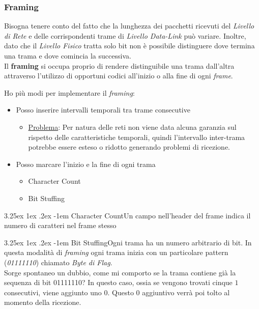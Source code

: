 \documentclass{article}
\makeatletter
\newcounter{subsubsubsection}[subsubsection]
\renewcommand\paragraph{\@startsection{paragraph}{5}{\z@}%
  {3.25ex \@plus1ex \@minus.2ex}%
  {-1em}%
  {\normalfont\normalsize\bfseries}}
\makeatother
\begin{document}
        \subsubsection{Framing}
            Bisogna tenere conto del fatto che la lunghezza dei pacchetti ricevuti del \textit{Livello di Rete} e delle corrispondenti trame di \textit{Livello Data-Link} può variare. Inoltre, dato che il \textit{Livello Fisico} tratta solo bit non è possibile distinguere dove termina una trama e dove comincia la successiva. \\
            Il \textbf{framing} si occupa proprio di rendere distinguibile una trama dall'altra attraverso l'utilizzo di opportuni codici all'inizio o alla fine di ogni \textit{frame}.

                Ho più modi per implementare il \textit{framing}:
                \begin{itemize}
                    \item Posso inserire intervalli temporali tra trame consecutive
                          \begin{itemize}
                              \item \underline{Problema}: Per natura delle reti non viene data alcuna garanzia sul rispetto delle caratteristiche temporali, quindi l'intervallo inter-trama potrebbe essere esteso o ridotto generando problemi di ricezione. 
                          \end{itemize}
                    \item Posso marcare l'inizio e la fine di ogni trama
                          \begin{itemize}
                              \item Character Count
                              \item Bit Stuffing
                          \end{itemize}
                \end{itemize}
                
                \paragraph{Character Count}Un campo nell'header del frame indica il numero di caratteri nel frame stesso

                \paragraph{Bit Stuffing}Ogni trama ha un numero arbitrario di bit. In questa modalità di \textit{framing} ogni trama inizia con un particolare pattern (\textit{01111110}) chiamato \textit{Byte di Flag}.\\
                Sorge spontaneo un dubbio, come mi comporto se la trama contiene già la sequenza di bit 01111110? In questo caso, ossia se vengono trovati cinque $ 1 $ consecutivi, viene aggiunto uno 0. Questo 0 aggiuntivo verrà poi tolto al momento della ricezione.
\end{document}
